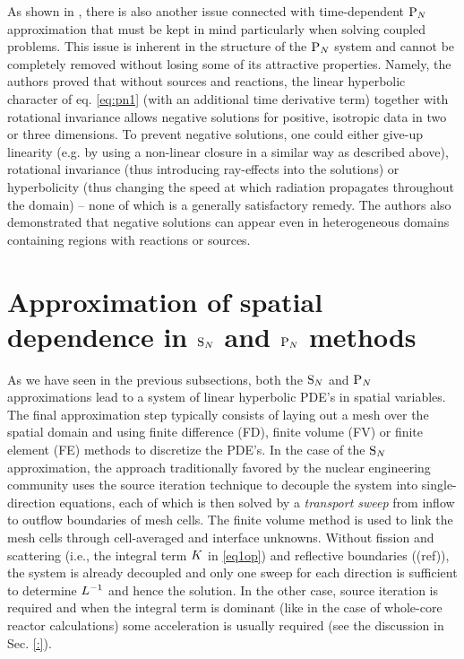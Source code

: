 As shown in \cite{McClarren4}, there is also another issue connected with time-dependent $\text{P}_{N}$ approximation that must
be kept in mind particularly when solving coupled problems. This issue is inherent in the structure of the $\text{P}_{N}$ system
and cannot be completely removed without losing some of its attractive properties. Namely, the authors proved that
without sources and reactions, the linear hyperbolic character of eq. \eqref{eq:pn1} (with an additional time derivative
term) together with rotational invariance allows negative solutions for positive, isotropic data in two or three
dimensions. To prevent negative solutions, one could either give-up linearity (e.g. by using a non-linear closure in a
similar way as described above), rotational invariance (thus introducing ray-effects into the solutions) or
hyperbolicity (thus changing the speed at which radiation propagates throughout the domain) -- none of which is a
generally satisfactory remedy. The authors also demonstrated that negative solutions can appear even in heterogeneous
domains containing regions with reactions or sources.

\section{Approximation of spatial dependence in $\text{S}_{N}$ and $\text{P}_{N}$ methods}
As we have seen in the previous subsections, both the $\text{S}_{N}$ and $\text{P}_{N}$ approximations lead to a system of linear
hyperbolic PDE's in spatial variables. The final approximation step typically consists of laying out a mesh over the
spatial domain and using finite difference (FD), finite volume (FV) or finite element (FE) methods to discretize the
PDE's. In the case of the $\text{S}_{N}$ approximation, the approach traditionally favored by the nuclear engineering community
uses the source iteration technique to decouple the system into single-direction equations, each of which is then solved
by a \textit{transport sweep} from inflow to outflow boundaries of mesh cells. The finite volume method is used to link
the mesh cells through cell-averaged and interface unknowns. Without fission and scattering (i.e., the integral term
$K$ in \eqref{eq1op}) and reflective boundaries (\alert(ref)), the system is already decoupled and only one
sweep for each direction is sufficient to determine $L^{-1}$ and hence the solution. In the other case, source
iteration is required and when the integral term is dominant (like in the case of whole-core reactor calculations) some
acceleration is usually required (see the discussion in Sec. \ref{:}).

